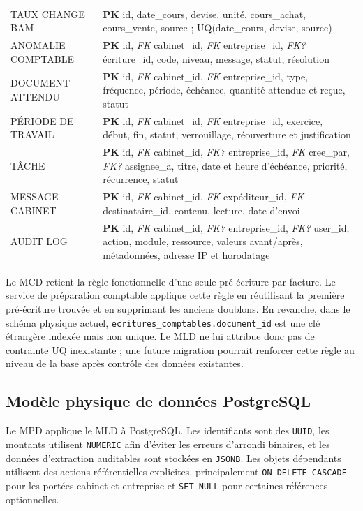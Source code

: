 \documentclass[12pt,a4paper,oneside]{report}
\begin{document}
\begin{longtable}{|L{4.4cm}|L{10cm}|}
TAUX CHANGE BAM & \textbf{PK} id, date\_cours, devise, unité, cours\_achat, cours\_vente, source ; \textsc{UQ}(date\_cours, devise, source) \\
ANOMALIE COMPTABLE & \textbf{PK} id, \textit{FK} cabinet\_id, \textit{FK} entreprise\_id, \textit{FK?} écriture\_id, code, niveau, message, statut, résolution \\
DOCUMENT ATTENDU & \textbf{PK} id, \textit{FK} cabinet\_id, \textit{FK} entreprise\_id, type, fréquence, période, échéance, quantité attendue et reçue, statut \\
PÉRIODE DE TRAVAIL & \textbf{PK} id, \textit{FK} cabinet\_id, \textit{FK} entreprise\_id, exercice, début, fin, statut, verrouillage, réouverture et justification \\
TÂCHE & \textbf{PK} id, \textit{FK} cabinet\_id, \textit{FK?} entreprise\_id, \textit{FK} cree\_par, \textit{FK?} assignee\_a, titre, date et heure d'échéance, priorité, récurrence, statut \\
MESSAGE CABINET & \textbf{PK} id, \textit{FK} cabinet\_id, \textit{FK} expéditeur\_id, \textit{FK} destinataire\_id, contenu, lecture, date d'envoi \\
AUDIT LOG & \textbf{PK} id, \textit{FK} cabinet\_id, \textit{FK?} entreprise\_id, \textit{FK?} user\_id, action, module, ressource, valeurs avant/après, métadonnées, adresse IP et horodatage \\
\bottomrule
\end{longtable}
\normalsize

Le MCD retient la règle fonctionnelle d'une seule pré-écriture par facture. Le service de préparation comptable applique cette règle en réutilisant la première pré-écriture trouvée et en supprimant les anciens doublons. En revanche, dans le schéma physique actuel, \texttt{ecritures\_comptables.document\_id} est une clé étrangère indexée mais non unique. Le MLD ne lui attribue donc pas de contrainte \textsc{UQ} inexistante ; une future migration pourrait renforcer cette règle au niveau de la base après contrôle des données existantes.

\subsection{Modèle physique de données PostgreSQL}

Le MPD applique le MLD à PostgreSQL. Les identifiants sont des \texttt{UUID}, les montants utilisent \texttt{NUMERIC} afin d'éviter les erreurs d'arrondi binaires, et les données d'extraction auditables sont stockées en \texttt{JSONB}. Les objets dépendants utilisent des actions référentielles explicites, principalement \texttt{ON DELETE CASCADE} pour les portées cabinet et entreprise et \texttt{SET NULL} pour certaines références optionnelles.
\end{document}
